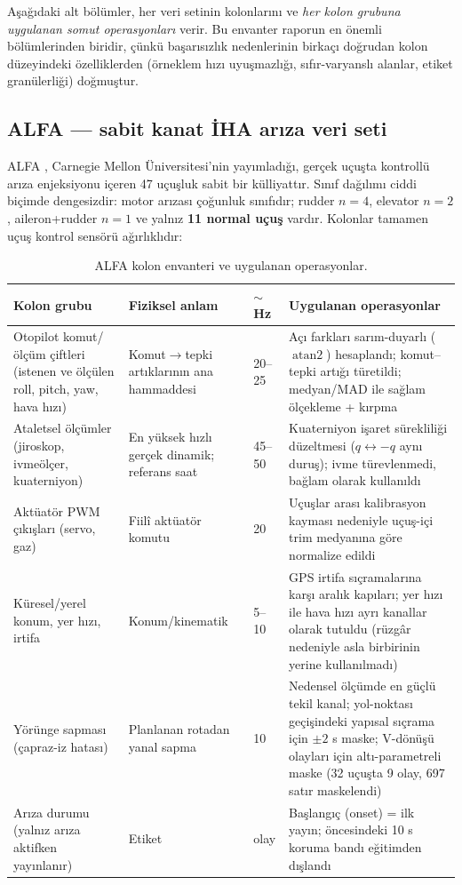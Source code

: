 \documentclass[11pt,a4paper]{article}
\begin{document}
Aşağıdaki alt bölümler, her veri setinin kolonlarını ve \emph{her kolon grubuna
uygulanan somut operasyonları} verir. Bu envanter raporun en önemli
bölümlerinden biridir, çünkü başarısızlık nedenlerinin birkaçı doğrudan kolon
düzeyindeki özelliklerden (örneklem hızı uyuşmazlığı, sıfır-varyanslı alanlar,
etiket granülerliği) doğmuştur.

\subsection{ALFA --- sabit kanat İHA arıza veri seti}
\label{sec:alfa-veri}

ALFA \cite{keipour2021alfa}, Carnegie Mellon Üniversitesi'nin yayımladığı,
gerçek uçuşta kontrollü arıza enjeksiyonu içeren 47 uçuşluk sabit bir
külliyattır. Sınıf dağılımı ciddi biçimde dengesizdir: motor arızası çoğunluk
sınıfıdır; rudder $n{=}4$, elevator $n{=}2$, aileron+rudder $n{=}1$ ve yalnız
\textbf{11 normal uçuş} vardır. Kolonlar tamamen uçuş kontrol sensörü
ağırlıklıdır:

\begin{table}[h]
\centering\small
\caption{ALFA kolon envanteri ve uygulanan operasyonlar.}
\label{tab:alfa-kolon}
\begin{tabular}{p{3.6cm}p{3.1cm}p{1cm}p{6.6cm}}
\toprule
Kolon grubu & Fiziksel anlam & $\sim$Hz & Uygulanan operasyonlar \\
\midrule
Otopilot komut/ölçüm çiftleri (istenen ve ölçülen roll, pitch, yaw, hava hızı) &
Komut$\to$tepki artıklarının ana hammaddesi & 20--25 & Açı farkları sarım-duyarlı
($\operatorname{atan2}$) hesaplandı; komut--tepki artığı türetildi; medyan/MAD
ile sağlam ölçekleme + kırpma \\
\addlinespace[2pt]
Ataletsel ölçümler (jiroskop, ivmeölçer, kuaterniyon) & En yüksek hızlı gerçek
dinamik; referans saat & 45--50 & Kuaterniyon işaret sürekliliği düzeltmesi
($q \leftrightarrow -q$ aynı duruş); ivme türevlenmedi, bağlam olarak kullanıldı \\
\addlinespace[2pt]
Aktüatör PWM çıkışları (servo, gaz) & Fiilî aktüatör komutu & 20 & Uçuşlar arası
kalibrasyon kayması nedeniyle uçuş-içi trim medyanına göre normalize edildi \\
\addlinespace[2pt]
Küresel/yerel konum, yer hızı, irtifa & Konum/kinematik & 5--10 & GPS irtifa
sıçramalarına karşı aralık kapıları; yer hızı ile hava hızı ayrı kanallar olarak
tutuldu (rüzgâr nedeniyle asla birbirinin yerine kullanılmadı) \\
\addlinespace[2pt]
Yörünge sapması (çapraz-iz hatası) & Planlanan rotadan yanal sapma & 10 &
Nedensel ölçümde en güçlü tekil kanal; yol-noktası geçişindeki yapısal sıçrama
için $\pm 2$ s maske; V-dönüşü olayları için altı-parametreli maske (32 uçuşta 9
olay, 697 satır maskelendi) \\
\addlinespace[2pt]
Arıza durumu (yalnız arıza aktifken yayınlanır) & Etiket & olay & Başlangıç
(onset) = ilk yayın; öncesindeki 10 s koruma bandı eğitimden dışlandı \\
\bottomrule
\end{tabular}
\end{table}
\end{document}
